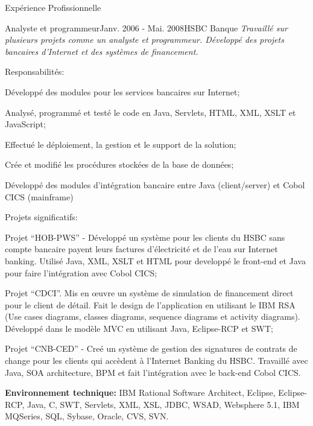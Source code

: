 \documentclass{resume}
\begin{document}
\begin{rSection}{Expérience Profissionnelle}
\begin{rSubsection}{\fontsize{12}{14}\selectfont Analyste et programmeur}{\fontsize{12}{14}\selectfont Janv. 2006 - Mai. 2008}{\fontsize{12}{14}\selectfont HSBC Banque}{}
    \textit{Travaillé sur plusieurs projets comme un analyste et programmeur. Développé des projets bancaires d'Internet et des systèmes de financement.}
    \end{rSubsection}
      \begin{rSubsection}{\fontsize{9}{10}\selectfont Responsabilités:}{}{}{}
        \item Développé des modules pour les services bancaires sur Internet;
        \item Analysé, programmé et testé le code en Java, Servlets, HTML, XML, XSLT et JavaScript;
        \item Effectué le déploiement, la gestion et le support de la solution;
        \item Crée et modifié les procédures stockées de la base de données;
        \item Développé des modules d'intégration bancaire entre Java (client/server) et Cobol CICS (mainframe)
      \end{rSubsection}

      \begin{rSubsection}{\fontsize{9}{10}\selectfont Projets significatifs:}{}{}{}
        \item Projet “HOB-PWS” - Développé un système pour les clients du HSBC sans compte bancaire payent leurs factures d'électricité et de l'eau sur Internet banking. Utilisé Java, XML, XSLT et HTML pour developpé le front-end et Java pour faire l'intégration avec Cobol CICS;
        \item Projet “CDCI”. Mis en œuvre un système de simulation de financement direct pour le client de détail. Fait le design de l’application en utilisant le IBM RSA (Use cases diagrams, classes diagrams, sequence diagrams et activity diagrams). Développé dans le modèle MVC en utilisant Java, Eclipse-RCP et SWT;
        \item Projet “CNB-CED” - Creé un système de gestion des signatures de contrats de change pour les clients qui accèdent à l'Internet Banking du HSBC. Travaillé avec Java, SOA architecture, BPM et fait l'intégration avec le back-end Cobol CICS.
      \end{rSubsection}

      {\fontsize{8}{9}\selectfont \textbf{Environnement technique:} IBM Rational Software Architect, Eclipse, Eclipse-RCP, Java, C, SWT, Servlets, XML, XSL, JDBC, WSAD, Websphere 5.1, IBM MQSeries, SQL, Sybase, Oracle, CVS, SVN.}

  \end{rSection}
\end{document}
